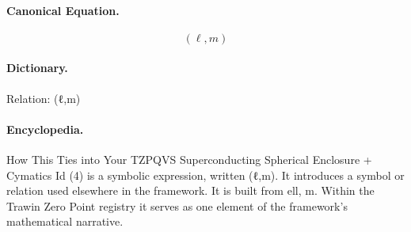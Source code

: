 \paragraph{Canonical Equation.}
\[
(\ell,m)
\]

\paragraph{Dictionary.}
Relation: (ℓ,m)

\paragraph{Encyclopedia.}
How This Ties into Your TZPQVS Superconducting Spherical Enclosure + Cymatics Id (4) is a symbolic expression, written (ℓ,m). It introduces a symbol or relation used elsewhere in the framework. It is built from ell, m. Within the Trawin Zero Point registry it serves as one element of the framework's mathematical narrative.
